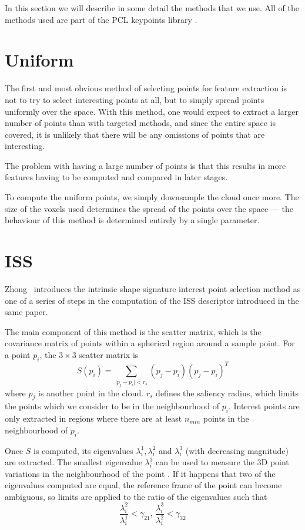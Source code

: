 \documentclass[11pt,a4paper]{kth-mag}
\begin{document}
In this section we will describe in some detail the methods that we use. All of
the methods used are part of the PCL keypoints library \cite{pcl_keypoints}.

\section{Uniform}
The first and most obvious method of selecting points for feature extraction is
not to try to select interesting points at all, but to simply spread points
uniformly over the space. With this method, one would expect to extract a larger
number of points than with targeted methods, and since the entire space is
covered, it is unlikely that there will be any omissions of points that are
interesting.

The problem with having a large number of points is that this results in more
features having to be computed and compared in later stages.

To compute the uniform points, we simply downsample the cloud once more. The
size of the voxels used determines the spread of the points over the space ---
the behaviour of this method is determined entirely by a single parameter.
\section{ISS}
Zhong~\cite{zhong2009intrinsic} introduces the intrinsic shape signature
interest point selection method as one of a series of steps in the computation
of the ISS descriptor introduced in the same paper.

The main component of this method is the scatter matrix, which is the covariance
matrix of points within a spherical region around a sample point. For a point
$p_i$, the $3\times 3$ scatter matrix is
\begin{equation}
  \label{eq:4}
  S(p_i)=\sum_{\mid p_j - p_i \mid < r_s}(p_j-p_i)(p_j-p_i)^T
\end{equation}
where $p_j$ is another point in the cloud. $r_s$ defines the saliency radius,
which limits the points which we consider to be in the neighbourhood of $p_i$.
Interest points are only extracted in regions where there are at least $n_{min}$
points in the neighbourhood of $p_i$.

Once $S$ is computed, its eigenvalues $\lambda^1_i, \lambda^2_i$ and
$\lambda^3_i$ (with decreasing magnitude) are extracted. The smallest eigenvalue
$\lambda^3_i$ can be used to measure the 3D point variations in the
neighbourhood of the point \cite{zhong2009intrinsic}. If it happens that two of
the eigenvalues computed are equal, the reference frame of the point can become
ambiguous, so limits are applied to the ratio of the eigenvalues such that
\begin{equation}
  \label{eq:8}
  \frac{\lambda^2_i}{\lambda^1_i}< \gamma_{21},\, \frac{\lambda^3_i}{\lambda^2_i}< \gamma_{32}
\end{equation}
\end{document}
